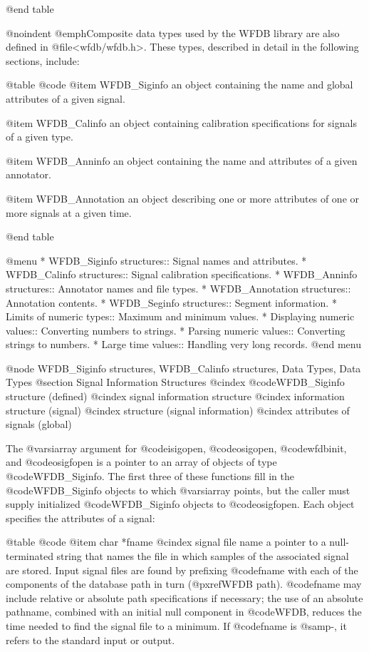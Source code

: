 {{{{{{{{{@end table

@noindent
@emph{Composite data types} used by the WFDB library are also defined in
@file{<wfdb/wfdb.h>}.  These types, described in detail in the following
sections, include:

@table @code
@item WFDB_Siginfo
an object containing the name and global attributes of a given signal.

@item WFDB_Calinfo
an object containing calibration specifications for signals of a given
type.

@item WFDB_Anninfo
an object containing the name and attributes of a given annotator.

@item WFDB_Annotation
an object describing one or more attributes of one or more signals at a
given time.

@end table

@menu
* WFDB_Siginfo structures::		Signal names and attributes.
* WFDB_Calinfo structures::		Signal calibration specifications.
* WFDB_Anninfo structures::		Annotator names and file types.
* WFDB_Annotation structures::		Annotation contents.
* WFDB_Seginfo structures::		Segment information.
* Limits of numeric types::		Maximum and minimum values.
* Displaying numeric values::		Converting numbers to strings.
* Parsing numeric values::		Converting strings to numbers.
* Large time values::			Handling very long records.
@end menu

@node WFDB_Siginfo structures, WFDB_Calinfo structures, Data Types, Data Types
@section Signal Information Structures
@cindex @code{WFDB_Siginfo} structure (defined)
@cindex signal information structure
@cindex information structure (signal)
@cindex structure (signal information)
@cindex attributes of signals (global)

The @var{siarray} argument for @code{isigopen}, @code{osigopen},
@code{wfdbinit}, and @code{osigfopen} is a pointer to an array of
objects of type @code{WFDB_Siginfo}.  The first three of these functions
fill in the @code{WFDB_Siginfo} objects to which @var{siarray} points, but
the caller must supply initialized @code{WFDB_Siginfo} objects to
@code{osigfopen}.  Each object specifies the attributes of a
signal:

@table @code
@item char *fname
@cindex signal file name
a pointer to a null-terminated string that names the file in which
samples of the associated signal are stored.  Input signal files are
found by prefixing @code{fname} with each of the components of the
database path in turn (@pxref{WFDB path}).  @code{fname} may include
relative or absolute path specifications if necessary; the use of an
absolute pathname, combined with an initial null component in @code{WFDB},
reduces the time needed to find the signal file to a minimum.  If
@code{fname} is @samp{-}, it refers to the standard input or
output.

}}}}}}}}}
